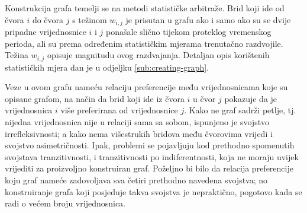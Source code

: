 \documentclass[lmodern, utf8, diplomski, numeric]{fer}
\begin{document}
  Konstrukcija grafa temelji se na metodi statističke arbitraže.
  Brid koji ide od čvora $i$ do čvora $j$ s težinom $w_{i,j}$ je prisutan u grafu ako i samo ako su se dvije pripadne vrijednosnice $i$ i $j$ ponašale slično tijekom proteklog vremenskog perioda, ali su prema određenim statističkim mjerama trenutačno razdvojile.
  Težina $w_{i,j}$ opisuje magnitudu ovog razdvajanja.
  Detaljan opis korištenih statističkih mjera dan je u odjeljku \ref{sub:creating-graph}.
    
  Veze u ovom grafu nameću relaciju preferencije među vrijednosnicama koje su opisane grafom, na način da brid koji ide iz čvora $i$ u čvor $j$ pokazuje da je vrijednosnica $i$ više preferirana od vrijednosnice $j$.
  Kako ne graf sadrži petlje, tj. nijedna vrijednosnica nije u relaciji sama sa sobom, ispunjeno je svojstvo irrefleksivnosti; a kako nema višestrukih bridova među čvorovima vrijedi i svojstvo asimetričnosti.
  Ipak, problemi se pojavljuju kod prethodno spomenutih svojstava tranzitivnosti, i tranzitivnosti po indiferentnosti, koja ne moraju uvijek vrijediti za proizvoljno konstruiran graf.
  Poželjno bi bilo da relacija preferencije koju graf nameće zadovoljava sva četiri prethodno navedena svojstva; no konstruiranje grafa koji posjeduje takva svojstva je nepraktično, pogotovo kada se radi o većem broju vrijednosnica.
  
\end{document}
